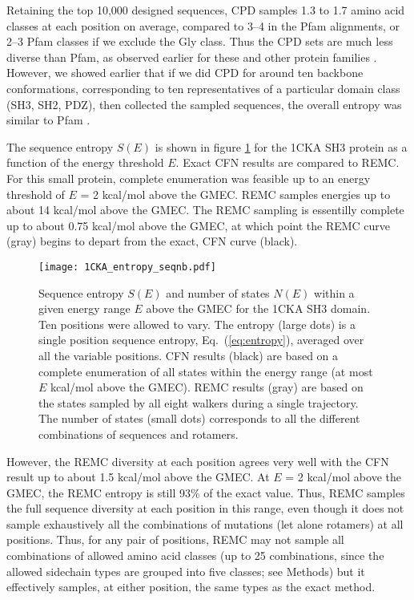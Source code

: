 Retaining the top 10,000 designed sequences, CPD samples 1.3 to 1.7 amino acid classes at each position on average, compared to 3--4 in the Pfam alignments, or 2--3 Pfam classes if we exclude the Gly class. Thus the CPD sets are much less diverse than Pfam, as observed earlier for these and other protein families \cite{Schmidt09,Schmidt10}. However, we showed earlier that if we did CPD for around ten backbone conformations, corresponding to ten representatives of a particular domain class (SH3, SH2, PDZ), then collected the sampled sequences, the overall entropy was similar to Pfam \cite{Schmidt09,Schmidt10}. 

The sequence entropy $S(E)$ is shown in figure \ref{fig:entropy} for the 1CKA SH3 protein as a function of the energy threshold $E$. Exact CFN results are compared to REMC. For this small protein, complete enumeration was feasible up to an energy threshold of $E$ = 2 kcal/mol above the GMEC. REMC samples energies up to about 14 kcal/mol above the GMEC. The REMC sampling is essentilly complete up to about 0.75 kcal/mol above the GMEC, at which point the REMC curve (gray) begins to depart from the exact, CFN curve (black).


    \begin{figure}[!htbp]
      \centering
        \texttt{[image: 1CKA\_entropy\_seqnb.pdf]} 
\caption{ 
Sequence entropy $S(E)$ and number of states $N(E)$ within a given energy range $E$ above the GMEC for the 1CKA SH3 domain. Ten positions were allowed to vary. The entropy (large dots) is a single position sequence entropy, Eq.\ (\ref{eq:entropy}), averaged over all the variable positions. CFN results (black) are based on a complete enumeration of all states within the energy range (at most $E$ kcal/mol above the GMEC). REMC results (gray) are based on the states sampled by all eight walkers during a single trajectory. The number of states (small dots) corresponds to all the different combinations of sequences and rotamers.
}
       \label{fig:entropy}
    \end{figure}

However, the REMC diversity at each position agrees very well with the CFN result up to about 1.5 kcal/mol above the GMEC. At $E$ = 2 kcal/mol above the GMEC, the REMC entropy is still 93\% of the exact value.
Thus, REMC samples the full sequence diversity at each position in this range, even though it does not sample exhaustively all the combinations of mutations (let alone rotamers) at all positions. Thus, for any pair of positions, REMC may not sample all combinations of allowed amino acid classes (up to 25 combinations, since the allowed sidechain types are grouped into five classes; see Methods) but it effectively samples, at either position, the same types as the exact method.

